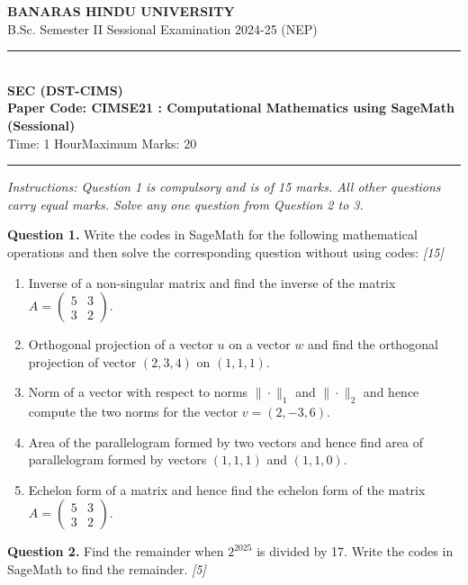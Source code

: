 \documentclass[11pt,a4paper]{article}
\newcommand{\pts}[1]{\hfill \textit{[#1]}}
\begin{document}
\begin{center}
  {\large\bfseries BANARAS HINDU UNIVERSITY}\\[2pt]
  {\normalsize B.Sc. Semester II Sessional Examination 2024-25 (NEP)}\\[6pt]
  \rule{0.8\linewidth}{0.5pt}\\[6pt]
  {\large\bfseries SEC (DST-CIMS)}\\[4pt]
  {\large\bfseries Paper Code: CIMSE21 : Computational Mathematics using SageMath (Sessional)}\\[4pt]
  {\normalsize Time: 1 Hour\hfill Maximum Marks: 20}
\end{center}

\rule{\linewidth}{0.4pt}

\smallskip

\noindent \textit{Instructions: Question 1 is compulsory and is of 15 marks. All other questions carry equal marks. Solve any one question from Question 2 to 3.}

\bigskip

\noindent \textbf{Question 1.} Write the codes in SageMath for the following mathematical operations and then solve the corresponding question without using codes: \pts{15}
\begin{enumerate}[label=(\alph*)]
  \item Inverse of a non-singular matrix and find the inverse of the matrix $A = \begin{pmatrix} 5 & 3 \\ 3 & 2 \end{pmatrix}$.
  \item Orthogonal projection of a vector $u$ on a vector $w$ and find the orthogonal projection of vector $(2, 3, 4)$ on $(1, 1, 1)$.
  \item Norm of a vector with respect to norms $\|\cdot\|_1$ and $\|\cdot\|_2$ and hence compute the two norms for the vector $v = (2, -3, 6)$.
  \item Area of the parallelogram formed by two vectors and hence find area of parallelogram formed by vectors $(1, 1, 1)$ and $(1, 1, 0)$.
  \item Echelon form of a matrix and hence find the echelon form of the matrix $A = \begin{pmatrix} 5 & 3 \\ 3 & 2 \end{pmatrix}$.
\end{enumerate}

\bigskip

\noindent \textbf{Question 2.} Find the remainder when $2^{2025}$ is divided by 17. Write the codes in SageMath to find the remainder. \pts{5}
\end{document}
